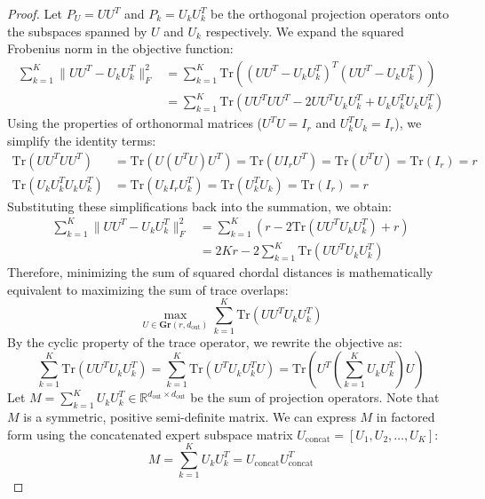 \documentclass{article}
\theoremstyle{plain}
\theoremstyle{definition}
\theoremstyle{remark}
\begin{document}
\begin{proof}
Let $P_U = U U^T$ and $P_k = U_k U_k^T$ be the orthogonal projection operators onto the subspaces spanned by $U$ and $U_k$ respectively. We expand the squared Frobenius norm in the objective function:
\begin{align}
\sum_{k=1}^K \| U U^T - U_k U_k^T \|_F^2 &= \sum_{k=1}^K \text{Tr}\left( (U U^T - U_k U_k^T)^T (U U^T - U_k U_k^T) \right) \\
&= \sum_{k=1}^K \text{Tr}\left( U U^T U U^T - 2 U U^T U_k U_k^T + U_k U_k^T U_k U_k^T \right)
\end{align}
Using the properties of orthonormal matrices ($U^T U = I_r$ and $U_k^T U_k = I_r$), we simplify the identity terms:
\begin{align}
\text{Tr}(U U^T U U^T) &= \text{Tr}(U (U^T U) U^T) = \text{Tr}(U I_r U^T) = \text{Tr}(U^T U) = \text{Tr}(I_r) = r \\
\text{Tr}(U_k U_k^T U_k U_k^T) &= \text{Tr}(U_k I_r U_k^T) = \text{Tr}(U_k^T U_k) = \text{Tr}(I_r) = r
\end{align}
Substituting these simplifications back into the summation, we obtain:
\begin{align}
\sum_{k=1}^K \| U U^T - U_k U_k^T \|_F^2 &= \sum_{k=1}^K \left( r - 2 \text{Tr}(U U^T U_k U_k^T) + r \right) \\
&= 2 K r - 2 \sum_{k=1}^K \text{Tr}(U U^T U_k U_k^T)
\end{align}
Therefore, minimizing the sum of squared chordal distances is mathematically equivalent to maximizing the sum of trace overlaps:
\begin{equation}
\max_{U \in \mathbf{Gr}(r, d_{\text{out}})} \sum_{k=1}^K \text{Tr}(U U^T U_k U_k^T)
\end{equation}
By the cyclic property of the trace operator, we rewrite the objective as:
\begin{equation}
\sum_{k=1}^K \text{Tr}(U U^T U_k U_k^T) = \sum_{k=1}^K \text{Tr}(U^T U_k U_k^T U) = \text{Tr}\left( U^T \left( \sum_{k=1}^K U_k U_k^T \right) U \right)
\end{equation}
Let $M = \sum_{k=1}^K U_k U_k^T \in \mathbb{R}^{d_{\text{out}} \times d_{\text{out}}}$ be the sum of projection operators. Note that $M$ is a symmetric, positive semi-definite matrix. We can express $M$ in factored form using the concatenated expert subspace matrix $U_{\text{concat}} = [U_1, U_2, \ldots, U_K]$:
\begin{equation}
M = \sum_{k=1}^K U_k U_k^T = U_{\text{concat}} U_{\text{concat}}^T
\end{equation}

\end{proof}
\end{document}
